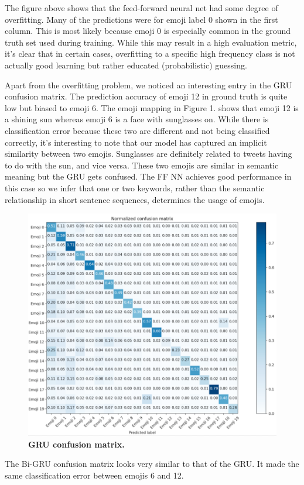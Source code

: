 \documentclass[11pt,a4paper]{article}
\begin{document}
	The figure above shows that the feed-forward neural net had some degree of overfitting. Many of the predictions were for emoji label 0 shown in the first column. This is most likely because emoji 0 is especially common in the ground truth set used during training. While this may result in a high evaluation metric, it's clear that in certain cases, overfitting to a specific high frequency class is not actually good learning but rather educated (probabilistic) guessing.
	\par
	Apart from the overfitting problem, we noticed an interesting entry in the GRU confusion matrix. The prediction accuracy of emoji 12 in ground truth is quite low but biased to emoji 6. The emoji mapping in Figure 1. shows that emoji 12 is a shining sun whereas emoji 6 is a face with sunglasses on. While there is classification error because these two are different and not being classified correctly, it's interesting to note that our model has captured an implicit similarity between two emojis. Sunglasses are definitely related to tweets having to do with the sun, and vice versa. These two emojis are similar in semantic meaning but the GRU gets confused. The FF NN achieves good performance in this case so we infer that one or two keywords, rather than the semantic relationship in short sentence sequences, determines the usage of emojis. 
	

	\begin{figure}[H]
		\hspace*{-1.3cm}
		\centering\includegraphics[scale=0.26]{gru_confusion} 
		\caption{\textbf{GRU confusion matrix.}}
	\end{figure}
		The Bi-GRU confusion matrix looks very similar to that of the GRU. It made the same classification error between emojis 6 and 12.
	
\end{document}

